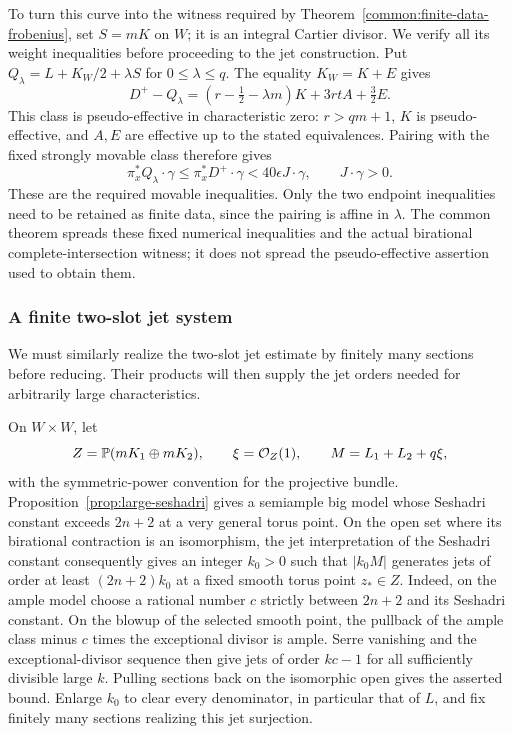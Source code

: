To turn this curve into the witness required by
Theorem~\ref{common:finite-data-frobenius}, set $S=mK$ on $W$;
it is an integral Cartier divisor. We verify all its weight inequalities
before proceeding to the jet construction. Put
$Q_\lambda=L+K_W/2+\lambda S$ for $0\le\lambda\le q$.
The equality $K_W=K+E$ gives
\begin{equation}\label{fr:slot-domination}
 D^+-Q_\lambda
 =(r-\tfrac12-\lambda m)K+3rtA+\tfrac32E.
\end{equation}
This class is pseudo-effective in characteristic zero: $r>qm+1$,
$K$ is pseudo-effective, and $A,E$ are effective up to the stated
equivalences. Pairing with the fixed strongly movable class therefore gives
\[
 \pi_x^*Q_\lambda\cdot\gamma
 \le \pi_x^*D^+\cdot\gamma
 <40\epsilon J\cdot\gamma,
 \qquad J\cdot\gamma>0.
\]
These are the required movable inequalities. Only the two endpoint
inequalities need to be retained as finite data, since the pairing is
affine in $\lambda$. The common theorem spreads these fixed numerical
inequalities and the actual birational complete-intersection witness;
it does not spread the pseudo-effective assertion used to obtain them.

\subsubsection{A finite two-slot jet system}

We must similarly realize the two-slot jet estimate by finitely many
sections before reducing.  Their products will then supply the jet
orders needed for arbitrarily large characteristics.

On \(W\times W\), let
\[
 Z=\mathbb{P}(mK_1\oplus mK_2),\qquad
 \xi=\mathcal{O}_Z(1),\qquad
 M=L_1+L_2+q\xi,
\]
with the symmetric-power convention for the projective bundle.
Proposition~\ref{prop:large-seshadri} gives a semiample big model whose
Seshadri constant exceeds \(2n+2\) at a very general torus point.
On the open set where its birational contraction is an isomorphism,
the jet interpretation of the Seshadri constant consequently gives
an integer \(k_0>0\) such that \(|k_0M|\) generates jets of order
at least \((2n+2)k_0\) at a fixed smooth torus point \(z_*\in Z\).
Indeed, on the ample model choose a rational number \(c\) strictly
between \(2n+2\) and its Seshadri constant. On the blowup of the
selected smooth point, the pullback of the ample class minus \(c\)
times the exceptional divisor is ample. Serre vanishing and the
exceptional-divisor sequence then give jets of order \(kc-1\) for
all sufficiently divisible large \(k\). Pulling sections back on the
isomorphic open gives the asserted bound.
Enlarge \(k_0\) to clear every denominator, in particular that of \(L\),
and fix finitely many sections realizing this jet surjection.


